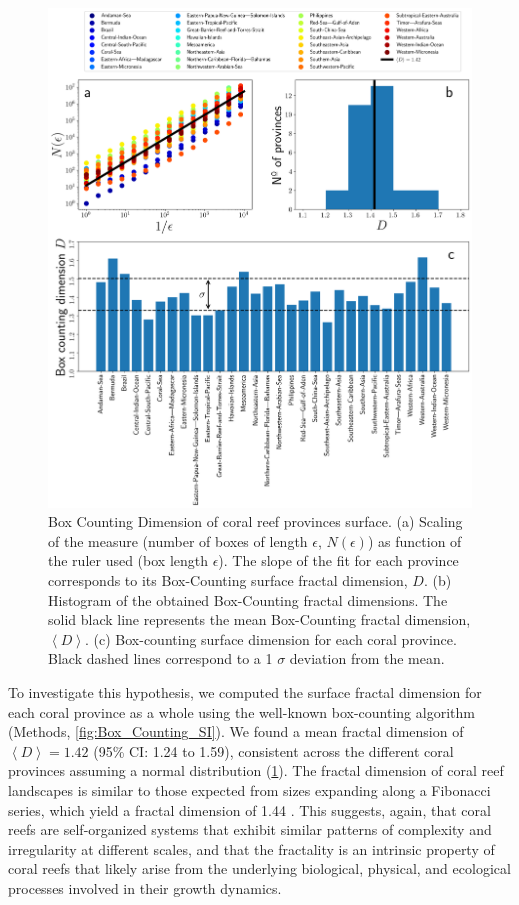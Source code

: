 \begin{figure}[H]
    \centering

    \includegraphics[width=1\textwidth]{Figures/Box_Counting_Dimensions.pdf}
    \caption{Box Counting Dimension of coral reef provinces surface. (a)
        Scaling of the measure (number of boxes of length $\epsilon$,
        $N(\epsilon)$) as
        function of the ruler used (box length $\epsilon$). The slope of the
        fit for
        each province corresponds to its Box-Counting surface fractal
        dimension, $D$.
        (b) Histogram of the obtained Box-Counting fractal dimensions. The
        solid black
        line represents the mean Box-Counting fractal dimension,
        $\left<D\right>$. (c)
        Box-counting surface dimension for each coral province. Black dashed
        lines
        correspond to a 1 $\sigma$ deviation from the mean.}
    \label{fig:Box_Counting_Dimension}
\end{figure}

To investigate this hypothesis, we computed the surface fractal dimension
for each coral province as a whole using the well-known box-counting algorithm
(Methods, \cref{fig:Box_Counting_SI}). We found a mean fractal dimension
of
$\left<D\right>=1.42$ (95\% CI: 1.24 to 1.59), consistent across the different
coral provinces assuming a normal distribution
(\cref{fig:Box_Counting_Dimension}). The fractal dimension of coral reef
landscapes is similar to those expected from sizes expanding along a Fibonacci
series, which yield a fractal dimension of 1.44 \cite{Sorensen1998}. This
suggests, again, that coral reefs are self-organized systems that exhibit
similar patterns of complexity and irregularity at different scales, and that
the fractality is an intrinsic property of coral reefs that likely arise from
the underlying biological, physical, and ecological processes involved in their
growth dynamics.

